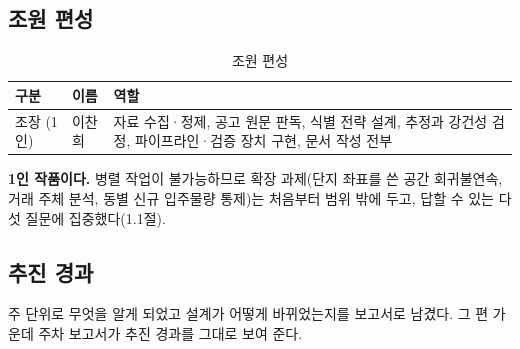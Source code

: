 
\subsection{조원 편성}

\begin{table}[htbp]
  \centering
  \caption{조원 편성}
  \label{tab:v2-team}
  \begin{tabular}{llp{8.6cm}}
    \toprule
    \textbf{구분} & \textbf{이름} & \textbf{역할} \\
    \midrule
    조장 (1인) & 이찬희 &
      자료 수집·정제, 공고 원문 판독, 식별 전략 설계, 추정과 강건성 검정,
      파이프라인·검증 장치 구현, 문서 작성 전부 \\
    \bottomrule
  \end{tabular}
\end{table}

\textbf{1인 작품이다.} 병렬 작업이 불가능하므로 확장 과제(단지 좌표를 쓴 공간
회귀불연속, 거래 주체 분석, 동별 신규 입주물량 통제)는 처음부터 범위 밖에 두고,
답할 수 있는 다섯 질문에 집중했다(1.1절).

\subsection{추진 경과}

주 단위로 무엇을 알게 되었고 설계가 어떻게 바뀌었는지를 보고서로 남겼다. 그
\pipeDocs 편 가운데 주차 보고서가 추진 경과를 그대로 보여 준다\citep{site}.

